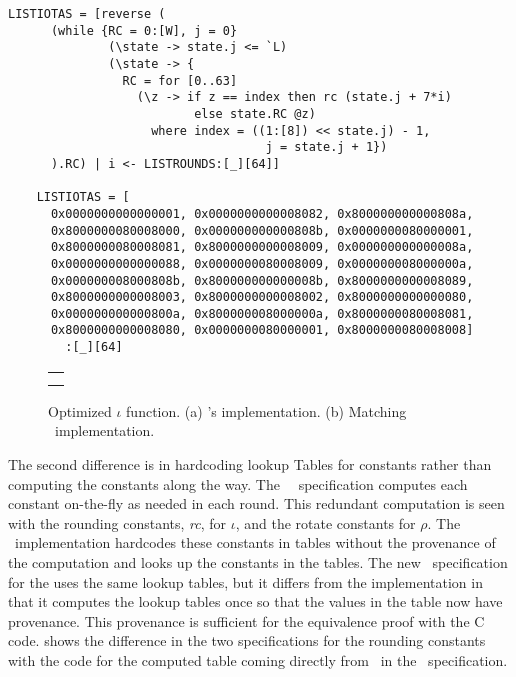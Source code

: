\newsavebox{\cryciota}
\begin{lrbox}{\cryciota}
  \begin{lstlisting}[language=Cryptol]
    LISTIOTAS = [reverse (
      (while {RC = 0:[W], j = 0} 
              (\state -> state.j <= `L) 
              (\state -> { 
                RC = for [0..63] 
                  (\z -> if z == index then rc (state.j + 7*i)
                          else state.RC @z)
                    where index = ((1:[8]) << state.j) - 1,
                                    j = state.j + 1})
      ).RC) | i <- LISTROUNDS:[_][64]]

    LISTIOTAS = [
      0x0000000000000001, 0x0000000000008082, 0x800000000000808a,
      0x8000000080008000, 0x000000000000808b, 0x0000000080000001,
      0x8000000080008081, 0x8000000000008009, 0x000000000000008a,
      0x0000000000000088, 0x0000000080008009, 0x000000008000000a,
      0x000000008000808b, 0x800000000000008b, 0x8000000000008089,
      0x8000000000008003, 0x8000000000008002, 0x8000000000000080,
      0x000000000000800a, 0x800000008000000a, 0x8000000080008081,
      0x8000000000008080, 0x0000000080000001, 0x8000000080008008]
        :[_][64]
  \end{lstlisting}    
\end{lrbox}

\begin{figure}[t]
  \begin{center}
    \begin{tabular}{l}
      \usebox{\cryciota} \\ \\
    \end{tabular}
  \end{center}
  \caption{Optimized $\iota$ function. (a) \openssl's implementation. (b) Matching \cryptol\ implementation.}
  \label{fig:iota}
\end{figure}

The second difference is in hardcoding lookup Tables for constants rather than computing the constants along the way.
The \fips\ \cryptol\ specification computes each constant on-the-fly as needed in each round.
This redundant computation is seen with the rounding constants, \emph{rc}, for $\iota$, and the rotate constants for $\rho$. 
The \openssl\ implementation hardcodes these constants in tables without the provenance of the computation and looks up the constants in the tables.
The new \cryptol\ specification for the \openssl uses the same lookup tables, but it differs from the \openssl implementation in that it computes the lookup tables once so that the values in the table now have provenance.
This provenance is sufficient for the equivalence proof with the C code.
 shows the difference in the two specifications for the rounding constants with the code for the computed table coming directly from \fips\ in the \openssl\ specification.